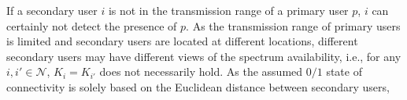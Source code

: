 \documentclass[10pt,journal,compsoc]{IEEEtran}
\theoremstyle{mytheoremstyle}
\theoremstyle{mytheoremstyle}
\theoremstyle{mytheoremstyle}
\begin{document}
%
If a secondary user $i$ is not in the transmission range of a primary user $p$, $i$ can certainly not detect the presence of $p$.
As the transmission range of primary users is limited and secondary users are located at different locations, different secondary users may have different views of the spectrum availability, i.e., for any $i, i' \in \mathcal{N}$, $K_i = K_{i'}$ does not necessarily hold.	
%
As the assumed $0/1$ state of connectivity is solely based on the Euclidean distance between secondary users,
\end{document}

